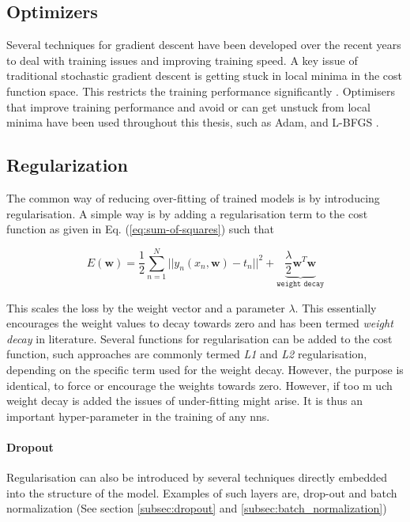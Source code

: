 \subsection{Optimizers}\label{subsec:optimizers}
Several techniques for gradient descent have been developed over the recent years to deal with training issues and improving training speed. A key issue of traditional stochastic gradient descent is getting stuck in local minima in the cost function space. This restricts the training performance significantly \cite{Goodfellow-et-al-2016}. Optimisers that improve training performance and avoid or can get unstuck from local minima have been used throughout this thesis, such as Adam, and L-BFGS \cite{Goodfellow-et-al-2016}. 

\subsection{Regularization}\label{sec:regularization}
The common way of reducing over-fitting of trained models is by introducing regularisation. A simple way is by adding a regularisation term to the cost function as given in Eq. (\ref{eq:sum-of-squares}) such that

\begin{equation}
    E(\mathbf{w}) = \frac{1}{2}\sum_{n=1}^N ||y_n(x_n,\mathbf{w}) - t_n ||^2 + \underbrace{\frac{\lambda}{2} \mathbf{w}^T \mathbf{w}}_{\texttt{weight decay}}
\end{equation}

This scales the loss by the weight vector and a parameter $\lambda$. This essentially encourages the weight values to decay towards zero and has been termed \emph{weight decay} in literature. Several functions for regularisation can be added to the cost function, such approaches are commonly termed \emph{L1} and \emph{L2} regularisation, depending on the specific term used for the weight decay. However, the purpose is identical, to force or encourage the weights towards zero. However, if too m uch weight decay is added the issues of under-fitting might arise. It is thus an important hyper-parameter in the training of any \glspl{nn}.

\paragraph{Dropout}
Regularisation can also be introduced by several techniques directly embedded into the structure of the model. Examples of such layers are, drop-out and batch normalization (See section \ref{subsec:dropout} and \ref{subsec:batch_normalization})


